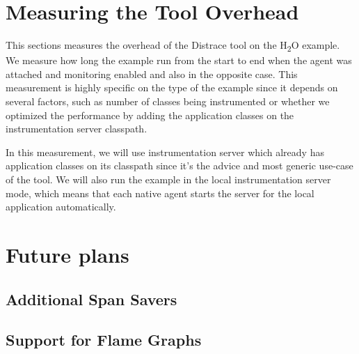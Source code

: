\section{Measuring the Tool Overhead}
This sections measures the overhead of the Distrace tool on the H\textsubscript{2}O example. We measure how long the example run from the start to end when the agent was attached and monitoring enabled and also in the opposite case. This measurement is highly specific on the type of the example since it depends on several factors, such as number of classes being instrumented or whether we optimized the performance by adding the application classes on the instrumentation server classpath.

In this measurement, we will use instrumentation server which already has application classes on its classpath since it's the advice and most generic use-case of the tool. We will also run  the example in the local instrumentation server mode, which means that each native agent starts the server for the local application automatically.



\section{Future plans}
\subsection{Additional Span Savers}
\subsection{Support for Flame Graphs}



